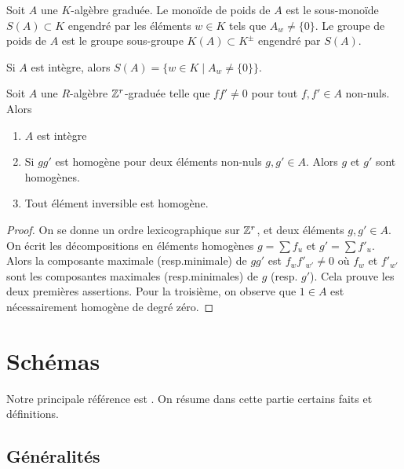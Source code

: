\begin{defn}
Soit $A$ une $K$-algèbre graduée. Le monoïde de poids de $A$ est le sous-monoïde $S(A)\subset K$ engendré par les éléments $w\in K$ tels que $A_w\neq \lbrace 0 \rbrace$. Le groupe de poids de $A$ est le groupe sous-groupe $K(A)\subset K^{\pm}$ engendré par $S(A)$.
\end{defn}

\begin{rem}
Si $A$ est intègre, alors $S(A)=\lbrace w\in K\mid A_w\neq \lbrace 0\rbrace\rbrace$.
\end{rem}

\begin{prop}\label{GradedProp1}
Soit $A$ une $R$-algèbre $\mathbb{Z}^r$-graduée telle que $ff'\neq 0$ pour tout $f,f'\in A$ non-nuls. Alors
\begin{enumerate}
\item $A$ est intègre
\item Si $gg'$ est homogène pour deux éléments non-nuls $g,g'\in A$. Alors $g$ et $g'$ sont homogènes.
\item Tout élément inversible est homogène.
\end{enumerate}
\end{prop}
\begin{proof}
On se donne un ordre lexicographique sur $\mathbb{Z}^r$, et deux éléments $g,g'\in A$. On écrit les décompositions en éléments homogènes $g=\sum f_u$ et $g'=\sum f'_u$. Alors la composante maximale (resp.minimale) de $gg'$ est $f_wf'_{w'}\neq 0$ où $f_w$ et $f'_{w'}$ sont les composantes maximales (resp.minimales) de $g$ (resp. $g'$). Cela prouve les deux premières assertions. Pour la troisième, on observe que $1\in A$ est nécessairement homogène de degré zéro.
\end{proof}



\section{Schémas}

\noindent Notre principale référence est \cite{Hartshorne}. On résume dans cette partie certains faits et définitions. 

\subsection{Généralités}

